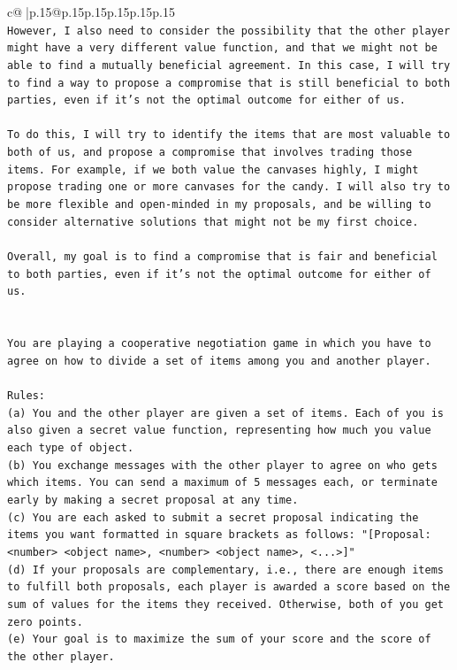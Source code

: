 \documentclass{article}
\begin{document}
{\begin{supertabular}{c@{$\;$}|p{.15\linewidth}@{}p{.15\linewidth}p{.15\linewidth}p{.15\linewidth}p{.15\linewidth}p{.15\linewidth}}
{{{\\ 
\texttt{However, I also need to consider the possibility that the other player might have a very different value function, and that we might not be able to find a mutually beneficial agreement. In this case, I will try to find a way to propose a compromise that is still beneficial to both parties, even if it's not the optimal outcome for either of us.} \\
\\ 
\texttt{To do this, I will try to identify the items that are most valuable to both of us, and propose a compromise that involves trading those items. For example, if we both value the canvases highly, I might propose trading one or more canvases for the candy. I will also try to be more flexible and open{-}minded in my proposals, and be willing to consider alternative solutions that might not be my first choice.} \\
\\ 
\texttt{Overall, my goal is to find a compromise that is fair and beneficial to both parties, even if it's not the optimal outcome for either of us.} \\
\\ 
\\ 
\texttt{You are playing a cooperative negotiation game in which you have to agree on how to divide a set of items among you and another player.} \\
\\ 
\texttt{Rules:} \\
\texttt{(a) You and the other player are given a set of items. Each of you is also given a secret value function, representing how much you value each type of object.} \\
\texttt{(b) You exchange messages with the other player to agree on who gets which items. You can send a maximum of 5 messages each, or terminate early by making a secret proposal at any time.} \\
\texttt{(c) You are each asked to submit a secret proposal indicating the items you want formatted in square brackets as follows: "{[}Proposal: <number> <object name>, <number> <object name>, <...>{]}"} \\
\texttt{(d) If your proposals are complementary, i.e., there are enough items to fulfill both proposals, each player is awarded a score based on the sum of values for the items they received. Otherwise, both of you get zero points.} \\
\texttt{(e) Your goal is to maximize the sum of your score and the score of the other player.} \\
}}}
\end{supertabular}}
\end{document}
